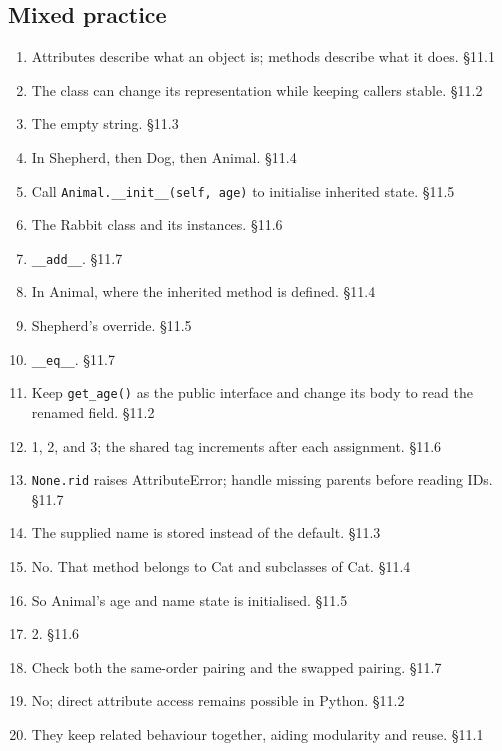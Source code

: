 \documentclass[11pt]{article}
\begin{document}
\begin{keepsection}\subsection{Mixed practice}

\begin{enumerate}
\item Attributes describe what an object is; methods describe what it does. \hfill{\small\color{FAUblue}§11.1}
\item The class can change its representation while keeping callers stable. \hfill{\small\color{FAUblue}§11.2}
\item The empty string. \hfill{\small\color{FAUblue}§11.3}
\item In Shepherd, then Dog, then Animal. \hfill{\small\color{FAUblue}§11.4}
\item Call \texttt{Animal.\_\_init\_\_(self, age)} to initialise inherited state. \hfill{\small\color{FAUblue}§11.5}
\item The Rabbit class and its instances. \hfill{\small\color{FAUblue}§11.6}
\item \texttt{\_\_add\_\_}. \hfill{\small\color{FAUblue}§11.7}
\item In Animal, where the inherited method is defined. \hfill{\small\color{FAUblue}§11.4}
\item Shepherd’s override. \hfill{\small\color{FAUblue}§11.5}
\item \texttt{\_\_eq\_\_}. \hfill{\small\color{FAUblue}§11.7}
\item Keep \texttt{get\_age()} as the public interface and change its body to read the renamed field. \hfill{\small\color{FAUblue}§11.2}
\item 1, 2, and 3; the shared tag increments after each assignment. \hfill{\small\color{FAUblue}§11.6}
\item \texttt{None.rid} raises AttributeError; handle missing parents before reading IDs. \hfill{\small\color{FAUblue}§11.7}
\item The supplied name is stored instead of the default. \hfill{\small\color{FAUblue}§11.3}
\item No. That method belongs to Cat and subclasses of Cat. \hfill{\small\color{FAUblue}§11.4}
\item So Animal’s age and name state is initialised. \hfill{\small\color{FAUblue}§11.5}
\item 2. \hfill{\small\color{FAUblue}§11.6}
\item Check both the same-order pairing and the swapped pairing. \hfill{\small\color{FAUblue}§11.7}
\item No; direct attribute access remains possible in Python. \hfill{\small\color{FAUblue}§11.2}
\item They keep related behaviour together, aiding modularity and reuse. \hfill{\small\color{FAUblue}§11.1}
\end{enumerate}

\end{keepsection}
\end{document}
